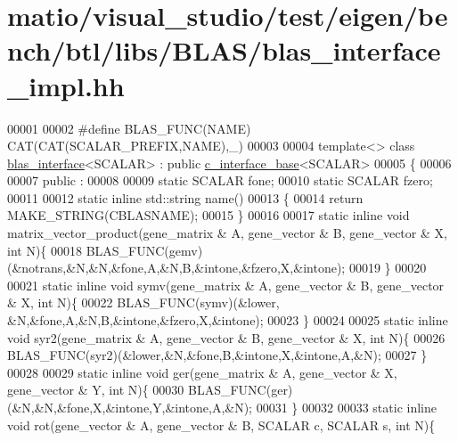 \hypertarget{matio_2visual__studio_2test_2eigen_2bench_2btl_2libs_2_b_l_a_s_2blas__interface__impl_8hh_source}{}\section{matio/visual\+\_\+studio/test/eigen/bench/btl/libs/\+B\+L\+A\+S/blas\+\_\+interface\+\_\+impl.hh}
\label{matio_2visual__studio_2test_2eigen_2bench_2btl_2libs_2_b_l_a_s_2blas__interface__impl_8hh_source}

\begin{DoxyCode}
00001 
00002 \textcolor{preprocessor}{#define BLAS\_FUNC(NAME) CAT(CAT(SCALAR\_PREFIX,NAME),\_)}
00003 
00004 \textcolor{keyword}{template}<> \textcolor{keyword}{class }\hyperlink{classblas__interface}{blas\_interface}<SCALAR> : \textcolor{keyword}{public} \hyperlink{classc__interface__base}{c\_interface\_base}<SCALAR>
00005 \{
00006 
00007 public :
00008   
00009   \textcolor{keyword}{static} SCALAR fone;
00010   \textcolor{keyword}{static} SCALAR fzero;
00011 
00012   \textcolor{keyword}{static} \textcolor{keyword}{inline} std::string name()
00013   \{
00014     \textcolor{keywordflow}{return} MAKE\_STRING(CBLASNAME);
00015   \}
00016 
00017   \textcolor{keyword}{static} \textcolor{keyword}{inline} \textcolor{keywordtype}{void} matrix\_vector\_product(gene\_matrix & A, gene\_vector & B, gene\_vector & X, \textcolor{keywordtype}{int} N)\{
00018     BLAS\_FUNC(gemv)(&notrans,&N,&N,&fone,A,&N,B,&intone,&fzero,X,&intone);
00019   \}
00020 
00021   \textcolor{keyword}{static} \textcolor{keyword}{inline} \textcolor{keywordtype}{void} symv(gene\_matrix & A, gene\_vector & B, gene\_vector & X, \textcolor{keywordtype}{int} N)\{
00022     BLAS\_FUNC(symv)(&lower, &N,&fone,A,&N,B,&intone,&fzero,X,&intone);
00023   \}
00024 
00025   \textcolor{keyword}{static} \textcolor{keyword}{inline} \textcolor{keywordtype}{void} syr2(gene\_matrix & A, gene\_vector & B, gene\_vector & X, \textcolor{keywordtype}{int} N)\{
00026     BLAS\_FUNC(syr2)(&lower,&N,&fone,B,&intone,X,&intone,A,&N);
00027   \}
00028 
00029   \textcolor{keyword}{static} \textcolor{keyword}{inline} \textcolor{keywordtype}{void} ger(gene\_matrix & A, gene\_vector & X, gene\_vector & Y, \textcolor{keywordtype}{int} N)\{
00030     BLAS\_FUNC(ger)(&N,&N,&fone,X,&intone,Y,&intone,A,&N);
00031   \}
00032 
00033   \textcolor{keyword}{static} \textcolor{keyword}{inline} \textcolor{keywordtype}{void} rot(gene\_vector & A,  gene\_vector & B, SCALAR c, SCALAR s, \textcolor{keywordtype}{int} N)\{

\end{DoxyCode}
